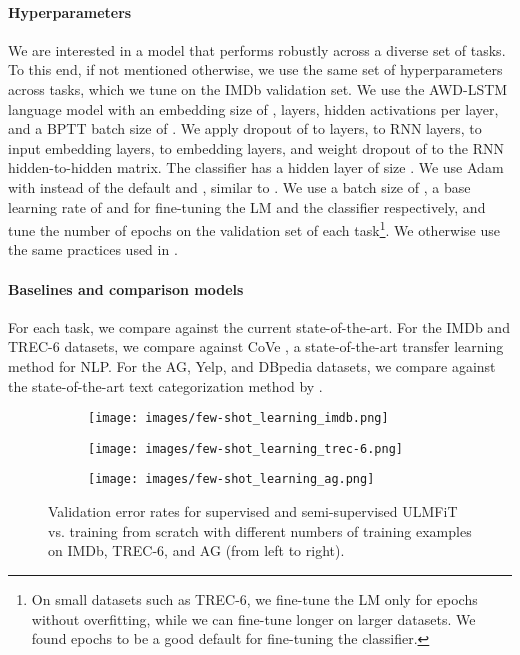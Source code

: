 \documentclass[11pt,a4paper]{article}
\begin{document}
\paragraph{Hyperparameters} We are interested in a model that performs robustly across a diverse set of tasks. To this end, if not mentioned otherwise, we use the same set of hyperparameters across tasks, which we tune on the IMDb validation set. We use the AWD-LSTM language model \cite{Merity2017} with an embedding size of ,  layers,  hidden activations per layer, and a BPTT batch size of . We apply dropout of  to layers,  to RNN layers,  to input embedding layers,  to embedding layers, and weight dropout of  to the RNN hidden-to-hidden matrix. The classifier has a hidden layer of size . We use Adam with  instead of the default  and , similar to \cite{Dozat2017}. We use a batch size of , a base learning rate of  and  for fine-tuning the LM and the classifier respectively, and tune the number of epochs on the validation set of each task\footnote{On small datasets such as TREC-6, we fine-tune the LM only for  epochs without overfitting, while we can fine-tune longer on larger datasets. We found  epochs to be a good default for fine-tuning the classifier.}. We otherwise use the same practices used in \cite{Merity2017}.

\paragraph{Baselines and comparison models} For each task, we compare against the current state-of-the-art. For the IMDb and TREC-6 datasets, we compare against CoVe \cite{Mccann2017}, a state-of-the-art transfer learning method for NLP. For the AG, Yelp, and DBpedia datasets, we compare against the state-of-the-art text categorization method by .

\begin{figure*}[!htb]
    \begin{subfigure}{.31\linewidth}
      \centering
         \texttt{[image: images/few-shot\_learning\_imdb.png]}
    \end{subfigure}\hspace*{0.3cm}
    \begin{subfigure}{.31\linewidth}
      \centering
         \texttt{[image: images/few-shot\_learning\_trec-6.png]}
    \end{subfigure}
    \hspace*{0.3cm}
    \begin{subfigure}{.31\linewidth}
      \centering
         \texttt{[image: images/few-shot\_learning\_ag.png]}
    \end{subfigure}
    \caption{Validation error rates for supervised and semi-supervised ULMFiT vs. training from scratch with different numbers of training examples on IMDb, TREC-6, and AG (from left to right).}
\label{fig:few-shot_learning}
\end{figure*}
\end{document}
